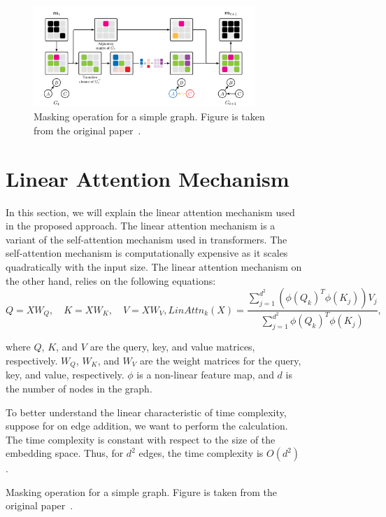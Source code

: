 \documentclass{lxaiproposal}
\begin{document}
\begin{figure}[h]
    \begin{figure}[h]
        \centering
        \includegraphics[width=0.92\textwidth]{figures/masking}
        \caption{Masking operation for a simple graph. Figure is taken from the original paper~\cite{deleu2022daggflownet}.}
        \label{fig:masking}
    \end{figure}


    \section{Linear Attention Mechanism}\label{app:linear_attention}
    \vspace*{-3mm}

    In this section, we will explain the linear attention mechanism used in the proposed approach. The linear attention
    mechanism is a variant of the self-attention mechanism used in transformers. The self-attention mechanism is
    computationally expensive as it scales quadratically with the input size. The linear attention mechanism on the
    other hand, relies on the following equations:
    \begin{equation}
        Q = XW_Q, \quad K = XW_K, \quad V = XW_V, LinAttn_k(X) = \frac{\sum_{j=1}^{d^2}
            \left(\phi(Q_k)^T\phi(K_j)\right)V_j}{\sum_{j=1}^{d^2} \phi(Q_k)^T\phi(K_j)},
        \label{eq:linear_attention}
    \end{equation}

    where $Q$, $K$, and $V$ are the query, key, and value matrices, respectively. $W_Q$, $W_K$, and $W_V$ are the
    weight matrices for the query, key, and value, respectively. $\phi$ is a non-linear feature map, and $d$ is the
    number of nodes in the graph.

    To better understand the linear characteristic of time complexity, suppose for on edge addition, we want to
    perform the calculation. The time complexity is constant with respect to the size of the embedding space. Thus,
    for $d^2$ edges, the time complexity is $O(d^2)$.



\end{figure}
\end{document}
